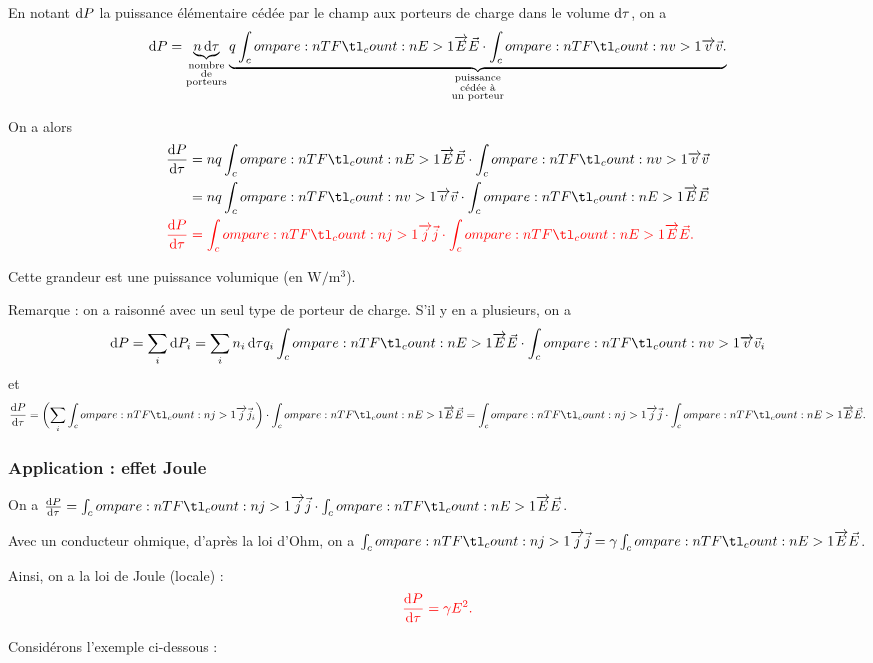 En notant \(\odif{P}\) la puissance élémentaire cédée par le champ aux porteurs de charge dans le volume \(\odif{\tau}\), on a \[\odif{P}=\underbrace{n\odif{\tau}}_{\substack{\text{nombre} \\ \text{de} \\ \text{porteurs}}}\underbrace{q\v{E}\scal\v{v}.}_{\substack{\text{puissance} \\ \text{cédée à} \\ \text{un porteur}}}\]

On a alors \[\begin{aligned}
\odv{P}{\tau}&=nq\v{E}\scal\v{v} \\
&=nq\v{v}\scal\v{E} \\
\color{red}\odv{P}{\tau}&\color{red}=\v{j}\scal\v{E}.
\end{aligned}\]

Cette grandeur est une puissance volumique (en \(\unit{\watt\per\cubic\metre}\)).

Remarque : on a raisonné avec un seul type de porteur de charge. S'il y en a plusieurs, on a \[\odif{P}=\sum_i\odif{P_i}=\sum_in_i\odif{\tau}q_i\v{E}\scal\v{v}_i\] et \[\odv{P}{\tau}=\paren{\sum_i\v{j}_i}\scal\v{E}=\v{j}\scal\v{E}.\]

\subsubsection{Application : effet Joule}

On a \(\odv{P}{\tau}=\v{j}\scal\v{E}\).

Avec un conducteur ohmique, d'après la loi d'Ohm, on a \(\v{j}=\gamma\v{E}\).

Ainsi, on a la loi de Joule (locale) : \[\color{red}\odv{P}{\tau}=\gamma E^2.\]

Considérons l'exemple ci-dessous :

\begin{center}
\end{center}

